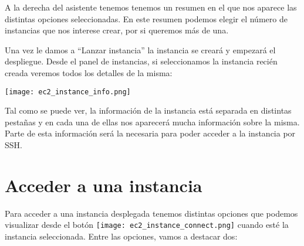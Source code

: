 A la derecha del asistente tenemos tenemos un resumen en el que nos aparece las distintas opciones seleccionadas. En este resumen podemos elegir el número de instancias que nos interese crear, por si queremos más de una.

Una vez le damos a “Lanzar instancia” la instancia se creará y empezará el despliegue. Desde el panel de instancias, si seleccionamos la instancia recién creada veremos todos los detalles de la misma:

\begin{center}
	\texttt{[image: ec2\_instance\_info.png]}
\end{center}

Tal como se puede ver, la información de la instancia está separada en distintas pestañas y en cada una de ellas nos aparecerá mucha información sobre la misma. Parte de esta información será la necesaria para poder acceder a la instancia por SSH.


\section{Acceder a una instancia}

Para acceder a una instancia desplegada tenemos distintas opciones que podemos visualizar desde el botón \texttt{[image: ec2\_instance\_connect.png]} cuando esté la instancia seleccionada. Entre las opciones, vamos a destacar dos:

